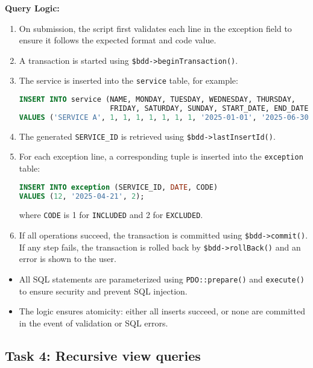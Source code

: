 \documentclass[a4paper, 12pt]{article}
\begin{document}
\textbf{Query Logic:}
\begin{enumerate}
    \item On submission, the script first validates each line in the exception field to ensure it follows the expected format and code value.
    \item A transaction is started using \texttt{\$bdd->beginTransaction()}.
    \item The service is inserted into the \texttt{service} table, for example:
    \begin{lstlisting}[language=SQL]
INSERT INTO service (NAME, MONDAY, TUESDAY, WEDNESDAY, THURSDAY,
                     FRIDAY, SATURDAY, SUNDAY, START_DATE, END_DATE)
VALUES ('SERVICE A', 1, 1, 1, 1, 1, 1, 1, '2025-01-01', '2025-06-30');
    \end{lstlisting}
    \item The generated \texttt{SERVICE\_ID} is retrieved using \texttt{\$bdd->lastInsertId()}.
    \item For each exception line, a corresponding tuple is inserted into the \texttt{exception} table:
    \begin{lstlisting}[language=SQL]
INSERT INTO exception (SERVICE_ID, DATE, CODE)
VALUES (12, '2025-04-21', 2);
    \end{lstlisting}
    where \texttt{CODE} is 1 for \texttt{INCLUDED} and 2 for \texttt{EXCLUDED}.
    \item If all operations succeed, the transaction is committed using \texttt{\$bdd->commit()}. If any step fails, the transaction is rolled back by \texttt{\$bdd->rollBack()} and an error is shown to the user.
\end{enumerate}

\begin{itemize}
    \item All SQL statements are parameterized using \texttt{PDO::prepare()} and \texttt{execute()} to ensure security and prevent SQL injection.
    \item The logic ensures atomicity: either all inserts succeed, or none are committed in the event of validation or SQL errors.
\end{itemize}




% 
\subsection{Task 4: Recursive view queries}
\end{document}
